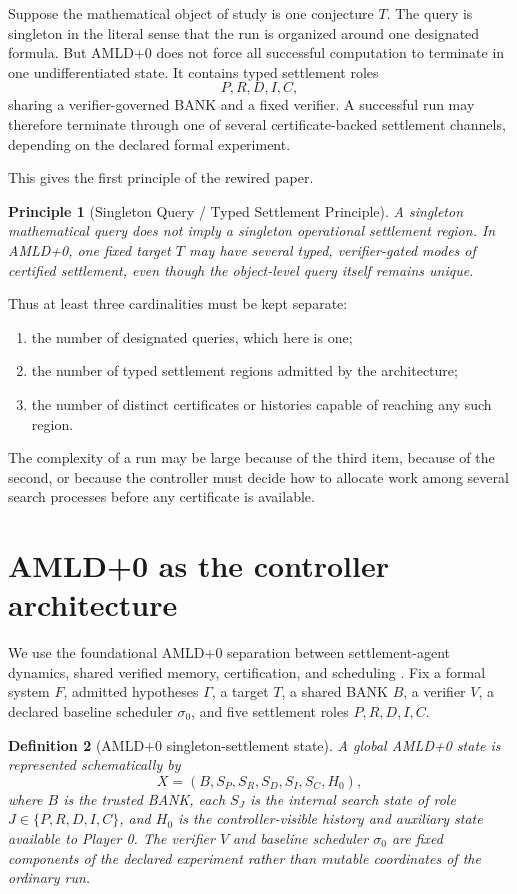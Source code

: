 \documentclass[11pt]{article}
\newtheorem{definition}{Definition}[section]
\newtheorem{principle}[definition]{Principle}
\begin{document}
Suppose the mathematical object of study is one conjecture $T$.  The query is
singleton in the literal sense that the run is organized around one designated
formula.  But AMLD+0 does not force all successful computation to terminate in
one undifferentiated state.  It contains typed settlement roles
\[
P,R,D,I,C,
\]
sharing a verifier-governed BANK and a fixed verifier.  A successful run may
therefore terminate through one of several certificate-backed settlement
channels, depending on the declared formal experiment.

This gives the first principle of the rewired paper.

\begin{principle}[Singleton Query / Typed Settlement Principle]
A singleton mathematical query does not imply a singleton operational
settlement region.  In AMLD+0, one fixed target $T$ may have several typed,
verifier-gated modes of certified settlement, even though the object-level
query itself remains unique.
\end{principle}

Thus at least three cardinalities must be kept separate:
\begin{enumerate}
    \item the number of designated queries, which here is one;
    \item the number of typed settlement regions admitted by the architecture;
    \item the number of distinct certificates or histories capable of reaching
    any such region.
\end{enumerate}

The complexity of a run may be large because of the third item, because of the
second, or because the controller must decide how to allocate work among
several search processes before any certificate is available.

\section{AMLD+0 as the controller architecture}

We use the foundational AMLD+0 separation between settlement-agent dynamics,
shared verified memory, certification, and scheduling \cite{tenneson-amldplus0}.
Fix a formal system $F$, admitted hypotheses $\Gamma$, a target $T$, a shared
BANK $B$, a verifier $V$, a declared baseline scheduler $\sigma_0$, and five
settlement roles $P,R,D,I,C$.

\begin{definition}[AMLD+0 singleton-settlement state]
A global AMLD+0 state is represented schematically by
\[
X=
(B,S_P,S_R,S_D,S_I,S_C,H_0),
\]
where $B$ is the trusted BANK, each $S_J$ is the internal search state of role
$J\in\{P,R,D,I,C\}$, and $H_0$ is the controller-visible history and auxiliary
state available to Player 0.  The verifier $V$ and baseline scheduler
$\sigma_0$ are fixed components of the declared experiment rather than
mutable coordinates of the ordinary run.
\end{definition}
\end{document}
